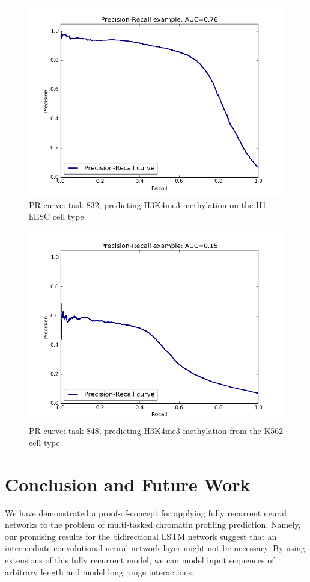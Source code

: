\documentclass{article}
\begin{document}
\begin{figure}[h]
\centering \includegraphics[width=.7\textwidth]{figures/pr_example832.png} 
\caption{PR curve: task 832, predicting H3K4me3 methylation on the H1-hESC cell type}
\label{fig:t3}
\end{figure}

\begin{figure}[h]
\centering \includegraphics[width=.7\textwidth]{figures/pr_example848.png}
\caption{PR curve: task 848, predicting H3K4me3 methylation from the K562 cell type}
\label{fig:t4}
\end{figure}


\section{Conclusion and Future Work}
We have demonstrated a proof-of-concept for applying fully recurrent neural networks to the problem of multi-tasked chromatin profiling prediction. Namely, our promising results for the bidirectional LSTM network suggest that an intermediate convolutional neural network layer might not be necessary.  By using extensions of this fully recurrent model, we can model input sequences of arbitrary length and model long range interactions.
\end{document}

